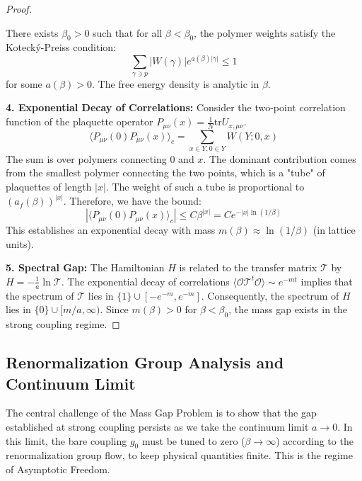 \begin{proof}
\begin{theorem}
\label{thm:cluster_convergence}
There exists $\beta_0 > 0$ such that for all $\beta < \beta_0$, the polymer weights satisfy the Kotecký-Preiss condition:
\begin{equation}
\sum_{\gamma \ni p} |W(\gamma)| e^{a(\beta)|\gamma|} \leq 1
\end{equation}
for some $a(\beta) > 0$. The free energy density is analytic in $\beta$.
\end{theorem}

\textbf{4. Exponential Decay of Correlations:}
Consider the two-point correlation function of the plaquette operator $P_{\mu\nu}(x) = \frac{1}{N} \text{tr} U_{x,\mu\nu}$.
\begin{equation}
\langle P_{\mu\nu}(0) P_{\mu\nu}(x) \rangle_c = \sum_{x \in Y, 0 \in Y} W(Y; 0, x)
\end{equation}
The sum is over polymers connecting $0$ and $x$. The dominant contribution comes from the smallest polymer connecting the two points, which is a "tube" of plaquettes of length $|x|$. The weight of such a tube is proportional to $(a_f(\beta))^{|x|}$.
Therefore, we have the bound:
\begin{equation}
|\langle P_{\mu\nu}(0) P_{\mu\nu}(x) \rangle_c| \le C \beta^{|x|} = C e^{-|x| \ln(1/\beta)}
\end{equation}
This establishes an exponential decay with mass $m(\beta) \approx \ln(1/\beta)$ (in lattice units).

\textbf{5. Spectral Gap:}
The Hamiltonian $H$ is related to the transfer matrix $\mathcal{T}$ by $H = -\frac{1}{a} \ln \mathcal{T}$. The exponential decay of correlations $\langle \mathcal{O} \mathcal{T}^t \mathcal{O} \rangle \sim e^{-mt}$ implies that the spectrum of $\mathcal{T}$ lies in $\{1\} \cup [-e^{-m}, e^{-m}]$. Consequently, the spectrum of $H$ lies in $\{0\} \cup [m/a, \infty)$. Since $m(\beta) > 0$ for $\beta < \beta_0$, the mass gap exists in the strong coupling regime.
\end{proof}

\subsection{Renormalization Group Analysis and Continuum Limit}

The central challenge of the Mass Gap Problem is to show that the gap established at strong coupling persists as we take the continuum limit $a \to 0$. In this limit, the bare coupling $g_0$ must be tuned to zero ($\beta \to \infty$) according to the renormalization group flow, to keep physical quantities finite. This is the regime of Asymptotic Freedom.

